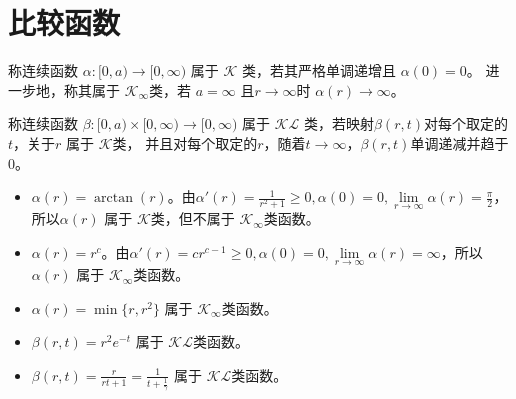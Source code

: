 \section{比较函数}\label{3Aref}

\begin{definition}
  称连续函数 $\alpha : [0, a) \rightarrow [0, \infty)$ 属于 $\mathcal{K}$ 类，若其严格单调递增且 $\alpha (0) =0$。
  进一步地，称其属于 $\mathcal{K}_{\infty}$类，若 $a = \infty$ 且$r \rightarrow \infty$时
  $\alpha (r) \rightarrow \infty$。
\end{definition}

\begin{definition}
  称连续函数 $\beta : [0, a) \times [0, \infty) \rightarrow [0,
  \infty)$ 属于 $\mathcal{K}\mathcal{L}$ 类，若映射$\beta (r, t)$对每个取定的$t$，关于$r$ 属于 $\mathcal{K}$类，
  并且对每个取定的$r$，随着$t
  \rightarrow \infty$，$\beta (r, t)$单调递减并趋于$ 0$。
\end{definition}

\begin{example}  
  \begin{itemize}[leftmargin=1em]
    \item $\alpha (r) = \arctan (r)$。由$\alpha' (r) = \frac{1}{r^2 + 1} \geq 0,
    \alpha (0) = 0, \lim\limits_{r \rightarrow \infty} \alpha (r) = \frac{\pi}{2}$，
    所以$\alpha (r)$ 属于 $\mathcal{K}$类，但不属于 $\mathcal{K}_{\infty}$类函数。
    
    \item $\alpha (r) = r^c$。由$ \alpha' (r) = c r^{c-1} \geq 0, \alpha (0) = 0, \lim\limits_{r
    \rightarrow \infty} \alpha (r) = \infty$，所以 $\alpha (r)$ 属于 $\mathcal{K}_{\infty}$类函数。
    
    \item $\alpha (r) = \min \{ r, r^2 \}$ 属于 $\mathcal{K}_{\infty}$类函数。
    
    \item $\beta (r, t) = r^2 e^{- t}$ 属于    $\mathcal{K}\mathcal{L}$类函数。
    \item $\beta (r, t) = \frac{r}{rt+1}=\frac{1}{t+\frac1\gamma}$ 属于 $\mathcal{K}\mathcal{L}$类函数。
  \end{itemize}
\end{example}

